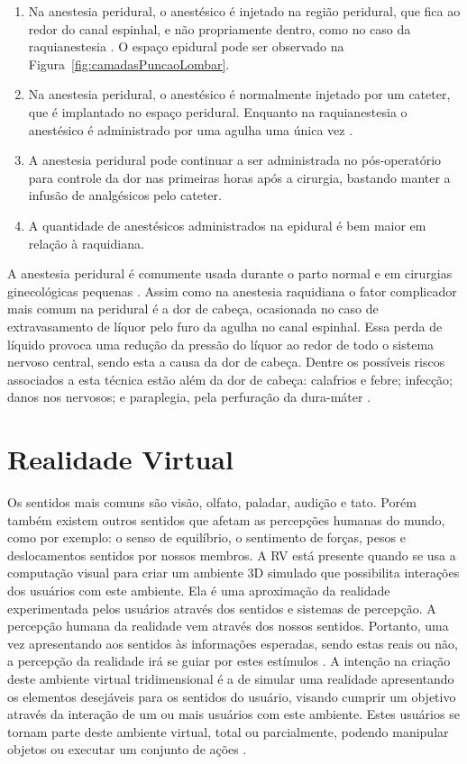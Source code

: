 \begin{enumerate}
  \item Na anestesia peridural, o anestésico é injetado na região peridural, que fica ao redor do canal espinhal, e não propriamente dentro, como no caso da raquianestesia \cite{Raj1988}. O espaço epidural pode ser observado na Figura~\ref{fig:camadasPuncaoLombar}.
  \item Na anestesia peridural, o anestésico é normalmente injetado por um cateter, que é implantado no espaço peridural. Enquanto na raquianestesia o anestésico é administrado por uma agulha uma única vez \cite{Raj1988}.
  \item A anestesia peridural pode continuar a ser administrada no pós-operatório para controle da dor nas primeiras horas após a cirurgia, bastando manter a infusão de analgésicos pelo cateter.
  \item A quantidade de anestésicos administrados na epidural é bem maior em relação à raquidiana.
\end{enumerate}

A anestesia peridural é comumente usada durante o parto normal e em cirurgias ginecológicas pequenas \cite{Raj1988}.
Assim como na anestesia raquidiana o fator complicador mais comum na peridural é a dor de cabeça, ocasionada no caso de extravasamento de líquor pelo furo da agulha no canal espinhal. Essa perda de líquido provoca uma redução da pressão do líquor ao redor de todo o sistema nervoso central, sendo esta a causa da dor de cabeça. Dentre os possíveis riscos associados a esta técnica estão além da dor de cabeça: calafrios e febre; infecção; danos nos nervosos; e paraplegia, pela perfuração da dura-máter \cite{Horlocker1997}.

\section{Realidade Virtual}

Os sentidos mais comuns são visão, olfato, paladar, audição e tato. Porém também existem outros sentidos que afetam as percepções humanas do mundo, como por exemplo: o senso de equilíbrio, o sentimento de forças, pesos e deslocamentos sentidos por nossos membros. A \acrfull{RV} está presente quando se usa a computação visual para criar um ambiente 3D simulado que possibilita interações dos usuários com este ambiente. Ela é uma aproximação da realidade experimentada pelos usuários através dos sentidos e sistemas de percepção. A percepção humana da realidade vem através dos nossos sentidos. Portanto, uma vez apresentando aos sentidos às informações esperadas, sendo estas reais ou não, a percepção da realidade irá se guiar por estes estímulos \cite{VRS2018}.
A intenção na criação deste ambiente virtual tridimensional é a de simular uma realidade apresentando os elementos desejáveis para os sentidos do usuário, visando cumprir um objetivo através da interação de um ou mais usuários com este ambiente. Estes usuários se tornam parte deste ambiente virtual, total ou parcialmente, podendo manipular objetos ou executar um conjunto de ações \cite{VRS2018}.

